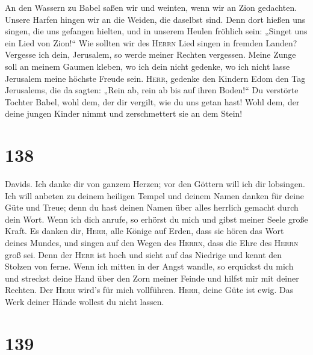  An den Wassern zu Babel saßen wir und weinten, wenn wir
an Zion gedachten.  Unsere Harfen hingen wir an die
Weiden, die daselbst sind.  Denn dort hießen uns singen,
die uns gefangen hielten, und in unserem Heulen fröhlich sein: „Singet
uns ein Lied von Zion!{}``  Wie sollten wir des
\textsc{Herrn} Lied singen in fremden Landen?  Vergesse
ich dein, Jerusalem, so werde meiner Rechten vergessen. 
Meine Zunge soll an meinem Gaumen kleben, wo ich dein nicht gedenke, wo
ich nicht lasse Jerusalem meine höchste Freude sein. 
\textsc{Herr}, gedenke den Kindern Edom den Tag Jerusalems, die da
sagten: „Rein ab, rein ab bis auf ihren Boden!{}``  Du
verstörte Tochter Babel, wohl dem, der dir vergilt, wie du uns getan
hast!  Wohl dem, der deine jungen Kinder nimmt und
zerschmettert sie an dem Stein!

\hypertarget{section-137}{%
\section{138}\label{section-137}}

 Davids. Ich danke dir von ganzem Herzen; vor den Göttern
will ich dir lobsingen.  Ich will anbeten zu deinem
heiligen Tempel und deinem Namen danken für deine Güte und Treue; denn
du hast deinen Namen über alles herrlich gemacht durch dein Wort.
 Wenn ich dich anrufe, so erhörst du mich und gibst meiner
Seele große Kraft.  Es danken dir, \textsc{Herr}, alle
Könige auf Erden, dass sie hören das Wort deines Mundes, 
und singen auf den Wegen des \textsc{Herrn}, dass die Ehre des
\textsc{Herrn} groß sei.  Denn der \textsc{Herr} ist hoch
und sieht auf das Niedrige und kennt den Stolzen von ferne.
 Wenn ich mitten in der Angst wandle, so erquickst du mich
und streckst deine Hand über den Zorn meiner Feinde und hilfst mir mit
deiner Rechten.  Der \textsc{Herr} wird's für mich
vollführen. \textsc{Herr}, deine Güte ist ewig. Das Werk deiner Hände
wollest du nicht lassen.

\hypertarget{section-138}{%
\section{139}\label{section-138}}

